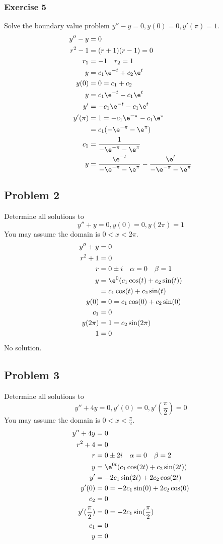 \documentclass{math}
\begin{document}
\subsubsection*{Exercise 5}
Solve the boundary value problem \( y''-y = 0, y(0) = 0, y'(\pi) = 1 \).
\begin{align*}
  y''-y &= 0 \\
  r^2-1 &= (r+1)(r-1) = 0 \\
  r_1 &= -1 \quad r_2 = 1 \\
  y &= c_1\e^{-t}+c_2\e^t \\
  y(0) &= 0 = c_1+c_2 \\
  y &= c_1\e^{-t}-c_1\e^t \\
  y' &= -c_1\e^{-t}-c_1\e^t \\
  y'(\pi) &= 1 = -c_1\e^{-\pi}-c_1\e^{\pi} \\
  &= c_1(-\e^{-\pi}-\e^{\pi}) \\
  c_1 &= \frac{1}{-\e^{-\pi}-\e^{\pi}} \\
  y &= \frac{\e^{-t}}{-\e^{-\pi}-\e^{\pi}}-\frac{\e^t}{-\e^{-\pi}-\e^{\pi}}
\end{align*}

\subsection*{Problem 2}
Determine all solutions to
\[ y''+y = 0, y(0) = 0, y(2\pi) = 1 \]
You may assume the domain is \( 0<x<2\pi \).
\begin{align*}
  y''+y &= 0 \\
  r^2+1 &= 0 \\
  r &= 0\pm i \quad \alpha = 0 \quad \beta = 1 \\
  y &= \e^{0}(c_1\cos(t)+c_2\sin(t)) \\
  &= c_1\cos(t)+c_2\sin(t) \\
  y(0) &= 0 = c_1\cos(0)+c_2\sin(0) \\
  c_1 &= 0 \\
  y(2\pi) &= 1 = c_2\sin(2\pi) \\
  1 &= 0
\end{align*}
No solution.

\subsection*{Problem 3}
Determine all solutions to
\[ y''+4y = 0, y'(0) = 0, y'(\frac{\pi}{2}) = 0 \]
You may assume the domain is \( 0<x<\frac{\pi}{2} \).
\begin{align*}
  y''+4y &= 0 \\
  r^2+4 &= 0 \\
  r &= 0\pm2i \quad \alpha = 0 \quad \beta = 2 \\
  y &= \e^{0t}(c_1\cos(2t)+c_2\sin(2t)) \\
  y' &= -2c_1\sin(2t)+2c_2\cos(2t) \\
  y'(0) &= 0 = -2c_1\sin(0)+2c_2\cos(0) \\
  c_2 &= 0 \\
  y'(\frac{\pi}{2}) &= 0 = -2c_1\sin(\frac{\pi}{2}) \\
  c_1 &= 0 \\
  y &= 0
\end{align*}
\end{document}

